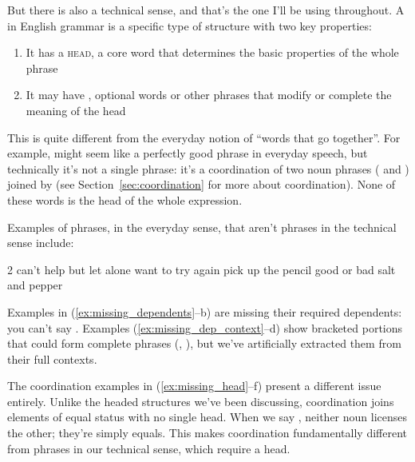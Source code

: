 But there is also a technical sense, and that's the one I'll be using throughout. A  in English grammar is a specific type of structure with two key properties:
\begin{enumerate}[noitemsep]
    \item It has a \textsc{head}, a core word that determines the basic properties of the whole phrase
    \item It may have , optional words or other phrases that modify or complete the meaning of the head
\end{enumerate}
This is quite different from the everyday notion of \enquote{words that go together}. For example,  might seem like a perfectly good phrase in everyday speech, but technically it's not a single phrase: it's a coordination of two noun phrases ( and ) joined by  (see Section~\ref{sec:coordination} for more about coordination). None of these words is the head of the whole expression.

Examples of phrases, in the everyday sense, that aren't phrases in the technical sense include:

\setlength{\columnsep}{0pt}
\begin{multicols}{2}
\ea
    \ea \label{ex:missing_dependents} can't help but
    \ex let alone
    \ex \label{ex:missing_dep_context} {\ob}want to{\cb} try again
    \ex {\ob}pick up{\cb} the pencil
    \ex good or bad\label{ex:missing_head}
    \ex  salt and pepper
\z
\z
\end{multicols}
Examples in (\ref{ex:missing_dependents}--b) are missing their required dependents: you can't say . Examples (\ref{ex:missing_dep_context}--d) show bracketed portions that could form complete phrases (, ), but we've artificially extracted them from their full contexts.

The coordination examples in (\ref{ex:missing_head}--f) present a different issue entirely. Unlike the headed structures we've been discussing, coordination joins elements of equal status with no single head. When we say , neither noun licenses the other; they're simply equals. This makes coordination fundamentally different from phrases in our technical sense, which require a head.

